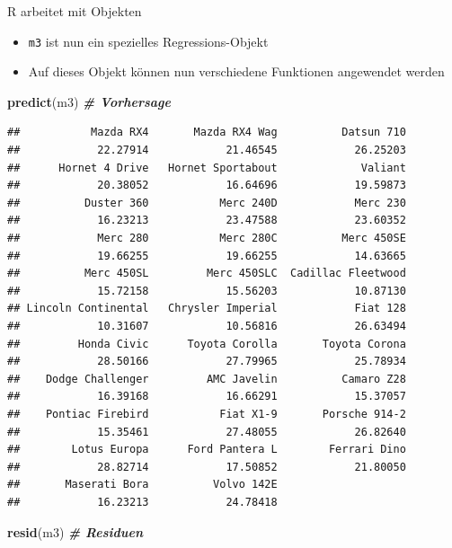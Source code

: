 \documentclass[
  ignorenonframetext,
]{beamer}
\newenvironment{Shaded}{\begin{snugshade}}{\end{snugshade}}
\newcommand{\CommentTok}[1]{\textcolor[rgb]{0.00,0.40,1.00}{\textbf{\textit{#1}}}}
\newcommand{\KeywordTok}[1]{\textcolor[rgb]{0.26,0.66,0.93}{\textbf{#1}}}
\newcommand{\NormalTok}[1]{\textcolor[rgb]{0.74,0.68,0.62}{#1}}
\providecommand{\tightlist}{%
  \setlength{\itemsep}{0pt}\setlength{\parskip}{0pt}}
\begin{document}
\begin{frame}[fragile]{R arbeitet mit Objekten}
\protect\hypertarget{r-arbeitet-mit-objekten}{}

\begin{itemize}
\tightlist
\item
  \texttt{m3} ist nun ein spezielles Regressions-Objekt
\item
  Auf dieses Objekt können nun verschiedene Funktionen angewendet werden
\end{itemize}

\begin{Shaded}
\begin{Highlighting}[]
\KeywordTok{predict}\NormalTok{(m3) }\CommentTok{# Vorhersage}
\end{Highlighting}
\end{Shaded}

\begin{verbatim}
##           Mazda RX4       Mazda RX4 Wag          Datsun 710 
##            22.27914            21.46545            26.25203 
##      Hornet 4 Drive   Hornet Sportabout             Valiant 
##            20.38052            16.64696            19.59873 
##          Duster 360           Merc 240D            Merc 230 
##            16.23213            23.47588            23.60352 
##            Merc 280           Merc 280C          Merc 450SE 
##            19.66255            19.66255            14.63665 
##          Merc 450SL         Merc 450SLC  Cadillac Fleetwood 
##            15.72158            15.56203            10.87130 
## Lincoln Continental   Chrysler Imperial            Fiat 128 
##            10.31607            10.56816            26.63494 
##         Honda Civic      Toyota Corolla       Toyota Corona 
##            28.50166            27.79965            25.78934 
##    Dodge Challenger         AMC Javelin          Camaro Z28 
##            16.39168            16.66291            15.37057 
##    Pontiac Firebird           Fiat X1-9       Porsche 914-2 
##            15.35461            27.48055            26.82640 
##        Lotus Europa      Ford Pantera L        Ferrari Dino 
##            28.82714            17.50852            21.80050 
##       Maserati Bora          Volvo 142E 
##            16.23213            24.78418
\end{verbatim}

\begin{Shaded}
\begin{Highlighting}[]
\KeywordTok{resid}\NormalTok{(m3) }\CommentTok{# Residuen}
\end{Highlighting}
\end{Shaded}


\end{frame}
\end{document}
